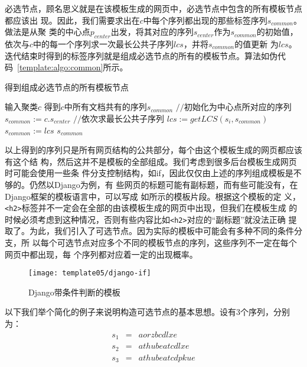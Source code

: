 必选节点，顾名思义就是在该模板生成的网页中，必选节点中包含的所有模板节点都应该出
现。因此，我们需要求出在$c$中每个序列都出现的那些标签序列$s_{common}$。做法是从聚
类的中心点$p_{center}$出发，将其对应的序列$s_{center}$作为$s_{common}$的初始值，
依次与$c$中的每一个序列求一次最长公共子序列$lcs$，并将$s_{common}$的值更新
为$lcs$。迭代结束时得到的标签序列就是组成必选节点的所有的模板节点。算法如伪代
码~\ref{template:algo:common}所示。
\begin{algorithm}
  \caption{得到组成必选节点的所有模板节点}
  \label{template:algo:common}
  \begin{algorithmic}[1]
    \Require 输入聚类$c$
    \Ensure 得到$c$中所有文档共有的序列$s_{common}$
    \State $//$初始化为中心点所对应的序列
    \State $s_{common} := c.s_{center}$
    \State $//$依次求最长公共子序列
    \State $lcs := getLCS(s_i, s_{common})$
    \State $s_{common} := lcs$
    \EndFor
    \State \Return $s_{common}$
    \EndFunction
  \end{algorithmic}
\end{algorithm}

以上得到的序列只是所有网页结构的公共部分，每个由这个模板生成的网页都应该有这个结
构，然后这并不是模板的全部组成。我们考虑到很多后台模板生成网页时可能会使用一些条
件分支控制结构，如if，因此仅仅由上述的序列组成模板是不够的。仍然以Django为例，有
些网页的标题可能有副标题，而有些可能没有，在Django框架的模板语言中，可以写成
如所示的模板片段。根据这个模板的定
义，\texttt{<h2>}标签并不一定会在全部的由该模板生成的网页中出现，但我们在模板生成
的时候必须考虑到这种情况，否则有些内容比如\texttt{<h2>}对应的“副标题”就没法正确
提取了。为此，我们引入了可选节点。因为实际的模板中可能会有多种不同的条件分支，所
以每个可选节点对应多个不同的模板节点的序列，这些序列不一定在每个网页中都出现，每
个序列都对应着一定的出现概率。

\begin{figure}
  \centering
  \texttt{[image: template05/django-if]}
  \caption{Django带条件判断的模板}
  \label{template:fig:django-if}
\end{figure}

以下我们举个简化的例子来说明构造可选节点的基本思想。设有3个序列，分别为：
\begin{eqnarray*}
s_1&=&aorzbcdlxe\\
s_2&=&athubeatcdlxe\\
s_3&=&athubeatcdpkue
\end{eqnarray*}

